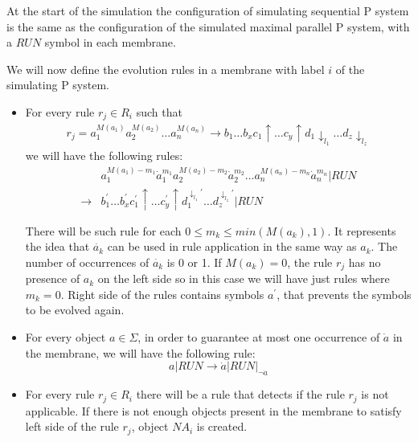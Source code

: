 \begin{dokaz}
  At the start of the simulation the configuration of simulating sequential P system is the same as the configuration of the simulated maximal parallel P system, with a $\mathit{RUN}$ symbol in each membrane.


  We will now define the evolution rules in a membrane with label $i$ of the simulating P system.

  \begin{itemize}
    \item For every rule $r_j\in R_i$ such that
      \begin{align*}
        r_j = a_1^{M(a_1)}a_2^{M(a_2)}\dots a_n^{M(a_n)} \rightarrow b_1\dots b_x c_1\uparrow\dots c_y\uparrow d_1\downarrow_{l_1}\dots d_z\downarrow_{l_z}
      \end{align*}
      we will have the following rules:
      \begin{align*}
        &a_1^{M(a_1)-m_1}\dot{a}_1^{m_1}
        a_2^{M(a_2)-m_2}\dot{a}_2^{m_2}\dots
        a_n^{M(a_n)-m_n}\dot{a}_n^{m_n}|\mathit{RUN} \\
        \rightarrow &b_1^\prime\dots b_x^\prime c_1^\prime\uparrow\dots c_y^\prime\uparrow d_1^{\downarrow_{l_1}\prime}\dots d_z^{\downarrow_{l_z}\prime}|\mathit{RUN}
      \end{align*}
      
      There will be such rule for each $0\leq m_k\leq min(M(a_k),1)$. It represents the idea that $\dot{a_k}$ can be used in rule application in the same way as $a_k$. The number of occurrences of $\dot{a_k}$ is 0 or 1. If $M(a_k) = 0$, the rule $r_j$ has no presence of $a_k$ on the left side so in this case we will have just rules where $m_k=0$. Right side of the rules contains symbols $a^\prime$, that prevents the symbols to be evolved again.

    \item For every object $a\in\Sigma$, in order to guarantee at most one occurrence of $\dot{a}$ in the membrane, we will have the following rule:
    $$a|\mathit{RUN} \rightarrow \dot{a}|\mathit{RUN}|_{\neg \dot{a}}$$

    \item For every rule $r_j\in R_i$ there will be a rule that detects if the rule $r_j$ is not applicable. If there is not enough objects present in the membrane to satisfy left side of the rule $r_j$, object $\mathit{NA_i}$ is created.


\end{itemize}
\end{dokaz}
